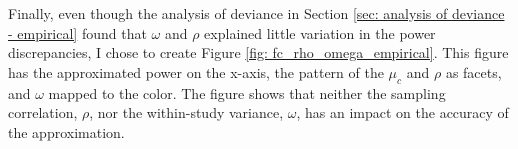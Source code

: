


Finally, even though the analysis of deviance in Section \ref{sec: analysis of deviance - empirical} found that $\omega$ and $\rho$ explained little variation in the power discrepancies, I chose to create Figure \ref{fig: fc_rho_omega_empirical}. This figure has the approximated power on the x-axis, the pattern of the $\mu_c$ and $\rho$ as facets, and $\omega$ mapped to the color. The figure shows that neither the sampling correlation, $\rho$, nor the within-study variance, $\omega$, has an impact on the accuracy of the approximation.

